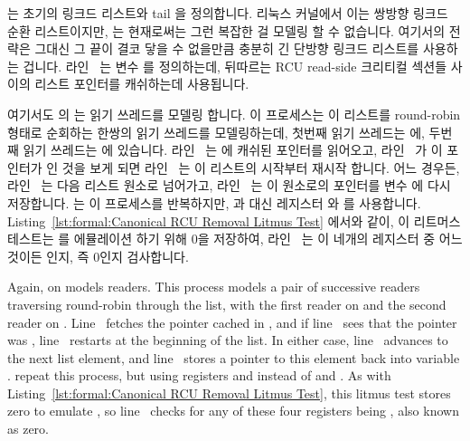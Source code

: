 \begin{fcvref}
\begin{fcvref}
{	\fi

}\QuickQuizEnd

 는 초기의 링크드 리스트와 tail 을 정의합니다.
리눅스 커널에서 이는 쌍방향 링크드 순환 리스트이지만,  는 현재로써는
그런 복잡한 걸 모델링 할 수 없습니다.
여기서의 전략은 그대신 그 끝이 결코 닿을 수 없을만큼 충분히 긴 단방향 링크드
리스트를 사용하는 겁니다.
라인~ 는 변수  를 정의하는데, 뒤따르는 RCU read-side
크리티컬 섹션들 사이의 리스트 포인터를 캐쉬하는데 사용됩니다.

\iffalse

\Clnrefrange{listtail}{listhead} define the initial linked
list, tail first.
In the Linux kernel, this would be a doubly linked circular list,
but \co{herd} is currently incapable of modeling such a beast.
The strategy is instead to use a singly linked linear list that
is long enough that the end is never reached.
Line~\lnref{rrcache} defines variable \co{c}, which is used to
cache the list pointer between successive RCU read-side critical
sections.

\fi

여기서도  의  는 읽기 쓰레드를 모델링
합니다.
이 프로세스는 이 리스트를 round-robin 형태로 순회하는 한쌍의 읽기 쓰레드를
모델링하는데, 첫번째 읽기 쓰레드는  에, 두번째 읽기
쓰레드는  에 있습니다.
라인~ 는  에 캐쉬된 포인터를 읽어오고,
라인~ 가 이 포인터가  인 것을 보게 되면
라인~ 는 이 리스트의 시작부터 재시작 합니다.
어느 경우든, 라인~ 는 다음 리스트 원소로 넘어가고,
라인~ 는 이 원소로의 포인터를 변수  에 다시 저장합니다.
 는 이 프로세스를 반복하지만,  과  대신
레지스터  와  를 사용합니다.
Listing~\ref{lst:formal:Canonical RCU Removal Litmus Test} 에서와 같이, 이
리트머스 테스트는  를 에뮬레이션 하기 위해 0을 저장하여,
라인~ 는 이 네개의 레지스터 중 어느것이든  인지, 즉
0인지 검사합니다.

\iffalse

Again,  on  models readers.
This process models a pair of successive readers traversing round-robin
through the list, with the first reader on 
and the second reader on .
Line~ fetches the pointer cached in , and if
line~ sees that the pointer was ,
line~ restarts at the beginning of the list.
In either case, line~ advances to the next list element,
and line~ stores a pointer to this element back into
variable .
 repeat this process, but using
registers  and  instead of  and .
As with
Listing~\ref{lst:formal:Canonical RCU Removal Litmus Test},
this litmus test stores zero to emulate , so
line~ checks for any of these four registers being
, also known as zero.


\end{fcvref}
\end{fcvref}
